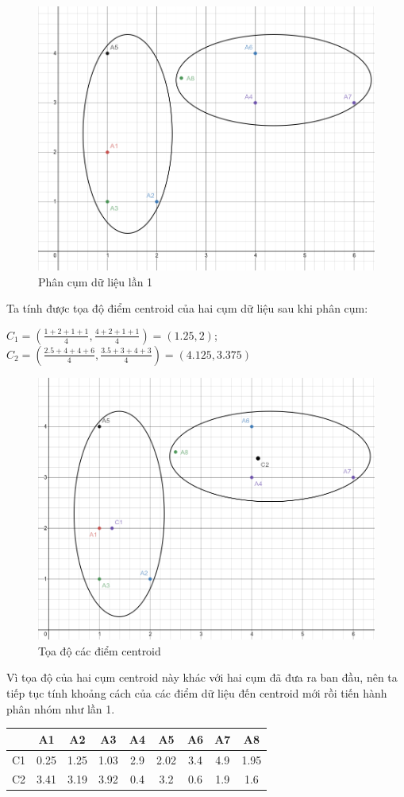\documentclass{article}
\begin{document}
	\begin{figure}[h]
		\centering
		\includegraphics[width=0.6\linewidth]{img/ex_2}
		\caption{Phân cụm dữ liệu lần 1}
	\end{figure}\par
	Ta tính được tọa độ điểm centroid của hai cụm dữ liệu sau khi phân cụm:\par
	$C_1 = \left(\frac{1 + 2 + 1 + 1}{4}, \frac{4 + 2 + 1 + 1}{4}\right) = (1.25,2)$; $C_2 = \left(\frac{2.5+4+4+6}{4}, \frac{3.5+3+4+3}{4}\right) = (4.125,3.375)$\par
	\begin{figure}[h]
		\centering
		\includegraphics[width=0.6\linewidth]{img/ex_3}
		\caption{Tọa độ các điểm centroid}
	\end{figure}\par
	\newpage
	Vì tọa độ của hai cụm centroid này khác với hai cụm đã đưa ra ban đầu, nên ta tiếp tục tính khoảng cách của các điểm dữ liệu đến centroid mới rồi tiến hành phân nhóm như lần 1.\par
	\begin{table}[h]
		\centering
		\begin{tabular}{|c|c|c|c|c|c|c|c|c|}
			\hline
			& A1 & A2 & A3 & A4 & A5 & A6 & A7 & A8 \\
			\hline
			C1 & 0.25 & 1.25 & 1.03 & 2.9 & 2.02 & 3.4 & 4.9 & 1.95 \\
			\hline
			C2 & 3.41 & 3.19 & 3.92 & 0.4 & 3.2 & 0.6 & 1.9 & 1.6 \\
			\hline
		\end{tabular}
	\end{table}\par
\end{document}
